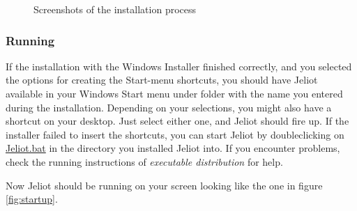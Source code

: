 \documentclass[a4paper,11pt,english]{article}
\newcommand{\jel}{Jeliot}
\newcommand{\file}{\url}
\begin{document}
\begin{figure}[htp]
\begin{center}
\end{center}
\label{fig:wininst_img}
\caption{Screenshots of the installation process}
\end{figure}

\subsubsection{Running}

If the installation with the Windows Installer finished correctly, and you selected the options for creating the Start-menu shortcuts, you should have \jel{} available in your Windows Start menu under folder with the name you entered during the installation. Depending on your selections, you might also have a shortcut on your desktop. Just select either one, and \jel{} should fire up. If the installer failed to insert the shortcuts, you can start \jel{} by doubleclicking on \file{Jeliot.bat} in the directory you installed \jel{} into. If you encounter problems, check the running instructions of \emph{executable distribution} for help.

Now \jel{} should be running on your screen looking like the one in figure \ref{fig:startup}.
\end{document}
